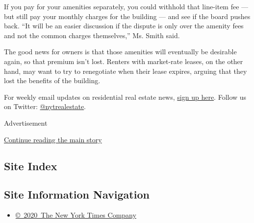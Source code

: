 If you pay for your amenities separately, you could withhold that
line-item fee --- but still pay your monthly charges for the building
--- and see if the board pushes back. ``It will be an easier discussion
if the dispute is only over the amenity fees and not the common charges
themselves,'' Ms. Smith said.

The good news for owners is that those amenities will eventually be
desirable again, so that premium isn't lost. Renters with market-rate
leases, on the other hand, may want to try to renegotiate when their
lease expires, arguing that they lost the benefits of the building.

For weekly email updates on residential real estate news,
\href{http://www.nytimes3xbfgragh.onion/newsletters/realestate/}{sign up
here}. Follow us on Twitter:
\href{https://twitter.com/nytrealestate}{@nytrealestate}.

Advertisement

\protect\hyperlink{after-bottom}{Continue reading the main story}

\hypertarget{site-index}{%
\subsection{Site Index}\label{site-index}}

\hypertarget{site-information-navigation}{%
\subsection{Site Information
Navigation}\label{site-information-navigation}}

\begin{itemize}
\tightlist
\item
  \href{https://help.nytimes3xbfgragh.onion/hc/en-us/articles/115014792127-Copyright-notice}{©~2020~The
  New York Times Company}
\end{itemize}

